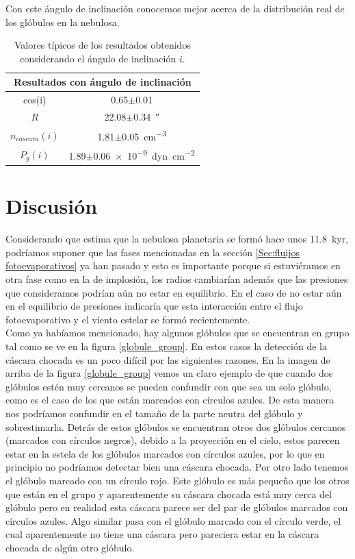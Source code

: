 \documentclass{book}
\begin{document}
Con este ángulo de inclinación conocemos mejor acerca de la distribución real de los glóbulos en la nebulosa.

\begin{table}[htb]
    \centering
    \begin{tabular}{c c}
        \toprule
        \multicolumn{2}{c}{Resultados con ángulo de inclinación} \\ \midrule
         cos(i) & 0.65$\pm$0.01 \\
         $R$ & 22.08$\pm$\SI{0.34}{\arcsecond}\\
         $n_{cascara}(i)$ & 1.81$\pm$\SI{0.05}{cm^{-3}}\\
         $P_{g}(i)$ & 1.89$\pm$\SI{0.06e-9}{dyn.cm^{-2}} \\
         \bottomrule
    \end{tabular}
    \caption{Valores típicos de los resultados obtenidos considerando el ángulo de inclinación $i$.}
    \label{tab:mean_i}
\end{table}


\chapter{Discusión}

Considerando que \cite{Zavala:2022} estima que la nebulosa planetaria se formó hace unos \SI{11.8}{kyr}, podríamos suponer que las fases mencionadas en la sección \ref{Sec:fluijos fotoevaporativos} ya han pasado y esto es importante porque si estuviéramos en otra fase como en la de implosión, los radios cambiarían además que las presiones que consideramos podrían aún no estar en equilibrio. En el caso de no estar aún en el equilibrio de presiones indicaría que esta interacción entre el flujo fotoevaporativo y el viento estelar se formó recientemente.\\

Como ya habíamos mencionado, hay algunos glóbulos que se encuentran en grupo tal como se ve en la figura \ref{globule_group}. En estos casos la detección de la cáscara chocada es un poco difícil por las siguientes razones. En la imagen de arriba de la figura \ref{globule_group} vemos un claro ejemplo de que cuando dos glóbulos estén muy cercanos se pueden confundir con que sea un solo glóbulo, como es el caso de los que están marcados con círculos azules. De esta manera nos podríamos confundir en el tamaño de la parte neutra del glóbulo y sobrestimarla. Detrás de estos glóbulos se encuentran otros dos glóbulos cercanos (marcados con círculos negros), debido a la proyección en el cielo, estos parecen estar en la estela de los glóbulos marcados con círculos azules, por lo que en principio no podríamos detectar bien una cáscara chocada. Por otro lado tenemos el glóbulo marcado con un círculo rojo. Este glóbulo es más pequeño que los otros que están en el grupo y aparentemente su cáscara chocada está muy cerca del glóbulo pero en realidad esta cáscara parece ser del par de glóbulos marcados con círculos azules. Algo similar pasa con el glóbulo marcado con el círculo verde, el cual aparentemente no tiene una cáscara pero pareciera estar en la cáscara chocada de algún otro glóbulo.
\end{document}
